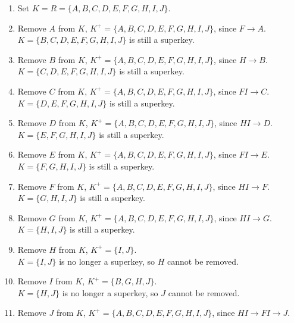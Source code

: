 \documentclass[11pt,letterpaper,titlepage,en-US]{article}
\begin{document}
\begin{homeworkProblem}
    \begin{homeworkSubProblem}
        \begin{enumerate}[label=\textbf{Step {\arabic*}}, leftmargin=2cm]
            \item Set $K = R = \{A,B,C,D,E,F,G,H,I,J\}$.
            \item Remove $A$ from $K$, $K^+ = \{A,B,C,D,E,F,G,H,I,J\}$, since $F \rightarrow A$.\\
                $K = \{B,C,D,E,F,G,H,I,J\}$ is still a superkey.
            \item Remove $B$ from $K$, $K^+ = \{A,B,C,D,E,F,G,H,I,J\}$, since $H \rightarrow B$.\\
                $K = \{C,D,E,F,G,H,I,J\}$ is still a superkey.
            \item Remove $C$ from $K$, $K^+ = \{A,B,C,D,E,F,G,H,I,J\}$, since $FI \rightarrow C$.\\
                $K = \{D,E,F,G,H,I,J\}$ is still a superkey.
            \item Remove $D$ from $K$, $K^+ = \{A,B,C,D,E,F,G,H,I,J\}$, since $HI \rightarrow D$.\\
                $K = \{E,F,G,H,I,J\}$ is still a superkey.
            \item Remove $E$ from $K$, $K^+ = \{A,B,C,D,E,F,G,H,I,J\}$, since $FI \rightarrow E$.\\
                $K = \{F,G,H,I,J\}$ is still a superkey.
            \item Remove $F$ from $K$, $K^+ = \{A,B,C,D,E,F,G,H,I,J\}$, since $HI \rightarrow F$.\\
                $K = \{G,H,I,J\}$ is still a superkey.
            \item Remove $G$ from $K$, $K^+ = \{A,B,C,D,E,F,G,H,I,J\}$, since $HI \rightarrow G$.\\
                $K = \{H,I,J\}$ is still a superkey.
            \item Remove $H$ from $K$, $K^+ = \{I,J\}$. \\
                $K = \{I,J\}$ is no longer a superkey, so $H$ cannot be removed.
            \item Remove $I$ from $K$, $K^+ = \{B,G,H,J\}$. \\
                $K = \{H,J\}$ is no longer a superkey, so $J$ cannot be removed.
            \item Remove $J$ from $K$, $K^+ = \{A,B,C,D,E,F,G,H,I,J\}$, since $HI \rightarrow FI \rightarrow J$.\\

\end{enumerate}
\end{homeworkSubProblem}
\end{homeworkProblem}
\end{document}
